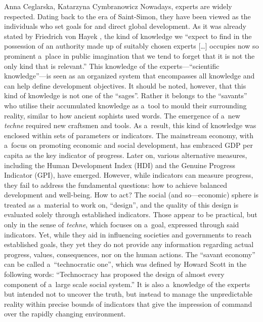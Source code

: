 \begin{artengenv2auth}{Anna Ceglarska, Katarzyna Cymbranowicz}
Nowadays, experts are widely respected. Dating back to the era of Saint-Simon, they have been viewed as the individuals who set goals for and direct global development. As it was already stated by Friedrich von Hayek 
\parencite*[][p.521]{hayek_use_1945}, %
 the kind of knowledge we ``expect to find in the possession of an authority made up of suitably chosen experts […] occupies now so prominent a~place in public imagination that we tend to forget that it is not the only kind that is relevant.'' This knowledge of the experts---``scientific knowledge''---is seen as an organized system that encompasses all knowledge and can help define development objectives. It should be noted, however, that this kind of knowledge is not one of the ``sages''. Rather it belongs to the ``savants'' who utilise their accumulated knowledge as a~tool to mould their surrounding reality, similar to how ancient sophists used words. The emergence of a~new \textit{techne} required new craftsmen and tools. As a~result, this kind of knowledge was enclosed within sets of parameters or indicators. The mainstream economy, with a~focus on promoting economic and social development, has embraced GDP per capita as the key indicator of progress. Later on, various alternative measures, including the Human Development Index (HDI) and the Genuine Progress Indicator (GPI), have emerged. However, while indicators can measure progress, they fail to address the fundamental questions: how to achieve balanced development and well-being. How to act? The social (and so---economic) sphere is treated as a~material to work on, ``design'', and the quality of this design is evaluated solely through established indicators. Those appear to be practical, but only in the sense of \textit{techne}, which focuses on a~goal, expressed through said indicators. Yet, while they aid in influencing societies and governments to reach established goals, they yet they do not provide any information regarding actual progress, values, consequences, nor on the human actions. The ``savant economy'' can be called a~``technocratic one'', which was defined by Howard Scott 
\parencite*[][p.10]{scott_history_1965} %
 in the following words: ``Technocracy has proposed the design of almost every component of a~large scale social system.'' It is also a~knowledge of the experts but intended not to uncover the truth, but instead to manage the unpredictable reality within precise bounds of indicators that give the impression of command over the rapidly changing environment.




\end{artengenv2auth}
